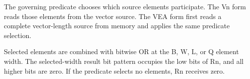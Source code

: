 The governing predicate chooses which source elements participate. The Vn form
reads those elements from the vector source. The VEA form first reads a complete
vector-length source from memory and applies the same predicate selection.

Selected elements are combined with bitwise OR at the B, W, L, or Q element
width. The selected-width result bit pattern occupies the low bits of Rn, and
all higher bits are zero. If the predicate selects no elements, Rn receives
zero.
